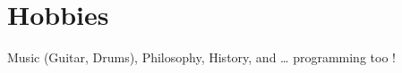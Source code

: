 \section{Hobbies}
    \resumeSubHeadingListStart
        \item{Music (Guitar, Drums), Philosophy, History, and … programming too !}
    \resumeSubHeadingListEnd
